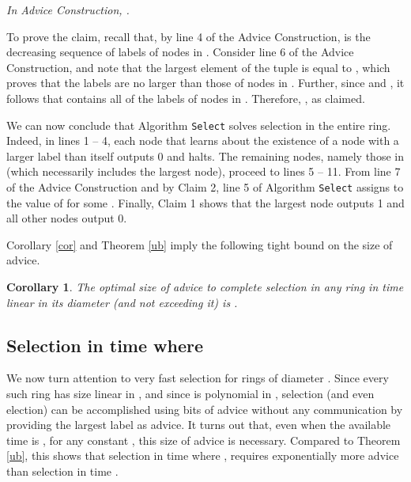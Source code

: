 \documentclass[11pt]{article}
\newtheorem{corollary}{Corollary}[section]
\newcommand{\qed}{\hfill  \bigbreak}
\newenvironment{proof}{\noindent {\bf Proof.}}{\qed}
\begin{document}
\begin{proof}
\vspace{3mm} 
\textit{In Advice Construction, .}
\vspace{3mm}

To prove the claim, recall that, by line 4 of the Advice Construction,  is the decreasing sequence of labels of nodes in . Consider line 6 of the Advice Construction, and note that the largest element  of the tuple  is equal to , which proves that the labels  are no larger than those of nodes in . Further, since  and , it follows that  contains all of the labels of nodes in . Therefore, , as claimed.

We can now conclude that Algorithm {\tt Select} solves selection in the entire ring. Indeed, in lines 1 -- 4, each node that learns about the existence of a node with a larger label than itself outputs 0 and halts. The remaining nodes, namely those in  (which necessarily includes the largest node), proceed to lines 5 -- 11. From line 7 of the Advice Construction and by Claim 2, line 5 of Algorithm {\tt Select} assigns to  the value of  for some . Finally, Claim 1 shows that the largest node outputs 1 and all other nodes output 0.
\end{proof}

Corollary \ref{cor} and Theorem \ref{ub} imply the following tight bound on the size of advice.

\begin{corollary}
The optimal size of advice to complete selection in any ring in time linear in its diameter (and not exceeding it) is  .
\end{corollary} 




\subsection{Selection in time  where }

We now turn attention to very fast selection for rings of diameter . Since every such ring has size  linear in , and since  is polynomial in , selection (and even election) can be 
accomplished using  bits of advice without any communication by providing the largest label as advice.
It turns out that, even when the available time is , for any constant , this size of advice is necessary.  Compared to Theorem \ref{ub},
this shows that
selection in time  where , requires exponentially more advice
than selection in time .
\end{document}
